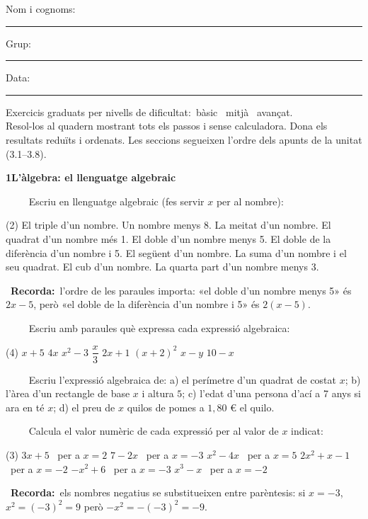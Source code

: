 \documentclass[11pt,a4paper]{article}
\newcommand{\estrelles}[1]{{\color{accent}\ifcase#1\or\faStar\faStar[regular]\faStar[regular]\or\faStar\faStar\faStar[regular]\or\faStar\faStar\faStar\fi}}
\newcounter{exer}
\newcommand{\ex}[1]{\par\needspace{4\baselineskip}\medskip\stepcounter{exer}\noindent{\color{navy}\bfseries\theexer.}\ \ {\small\estrelles{#1}}\ \ }
\newcommand{\seccio}[2]{\par\needspace{10\baselineskip}\bigskip
  \begin{tcolorbox}[colback=navy,colframe=navy,coltext=white,arc=2mm,boxrule=0pt,left=3mm,right=3mm,top=1.2mm,bottom=1.2mm]
  {\large\bfseries #1\quad #2}
  \end{tcolorbox}\vspace{-2pt}}
\newcommand{\recorda}[1]{\par\smallskip\begin{tcolorbox}[colback=accent!7,colframe=accent!55,arc=2mm,boxrule=0.5pt,left=2.5mm,right=2.5mm,top=1mm,bottom=1mm]\small{\color{accent}\faLightbulb[regular]}\ \textbf{Recorda:}\ #1\end{tcolorbox}}
\begin{document}
\thispagestyle{primera}

\vspace{10pt}
Nom i cognoms: \rule{8.4cm}{0.4pt}\hfill Grup: \rule{1.6cm}{0.4pt}\hfill Data: \rule{2.2cm}{0.4pt}
\vspace{8pt}

\begin{tcolorbox}[colback=soft,colframe=soft,arc=2mm,left=3mm,right=3mm,top=1.5mm,bottom=1.5mm]
\small Exercicis graduats per nivells de dificultat:\quad \estrelles{1}\ bàsic \qquad \estrelles{2}\ mitjà \qquad \estrelles{3}\ avançat.\\[2pt] Resol-los al quadern mostrant tots els passos i sense calculadora. Dona els resultats reduïts i ordenats. Les seccions segueixen l'ordre dels apunts de la unitat (3.1--3.8).
\end{tcolorbox}

\seccio{1}{L'àlgebra: el llenguatge algebraic}

\ex{1} Escriu en llenguatge algebraic (fes servir $x$ per al nombre):\begin{tasks}[after-item-skip=3pt](2)
  \task El triple d'un nombre.
  \task Un nombre menys 8.
  \task La meitat d'un nombre.
  \task El quadrat d'un nombre més 1.
  \task El doble d'un nombre menys 5.
  \task El doble de la diferència d'un nombre i 5.
  \task El següent d'un nombre.
  \task La suma d'un nombre i el seu quadrat.
  \task El cub d'un nombre.
  \task La quarta part d'un nombre menys 3.
\end{tasks}\recorda{l'ordre de les paraules importa: «el doble d'un nombre menys 5» és $2x-5$, però «el doble de la diferència d'un nombre i 5» és $2(x-5)$.}

\ex{1} Escriu amb paraules què expressa cada expressió algebraica:\begin{tasks}(4)
  \task $x+5$
  \task $4x$
  \task $x^2-3$
  \task $\dfrac{x}{3}$
  \task $2x+1$
  \task $(x+2)^2$
  \task $x-y$
  \task $10-x$
\end{tasks}

\ex{1} Escriu l'expressió algebraica de: a) el perímetre d'un quadrat de costat $x$; b) l'àrea d'un rectangle de base $x$ i altura $5$; c) l'edat d'una persona d'ací a 7 anys si ara en té $x$; d) el preu de $x$ quilos de pomes a $1{,}80$ € el quilo.

\ex{1} Calcula el valor numèric de cada expressió per al valor de $x$ indicat:\begin{tasks}[after-item-skip=5pt](3)
  \task $3x+5$ \ per a $x=2$
  \task $7-2x$ \ per a $x=-3$
  \task $x^{2}-4x$ \ per a $x=5$
  \task $2x^{2}+x-1$ \ per a $x=-2$
  \task $-x^{2}+6$ \ per a $x=-3$
  \task $x^{3}-x$ \ per a $x=-2$
\end{tasks}\recorda{els nombres negatius se substitueixen entre parèntesis: si $x=-3$, \ $x^2=(-3)^2=9$ però $-x^2=-(-3)^2=-9$.}
\end{document}
